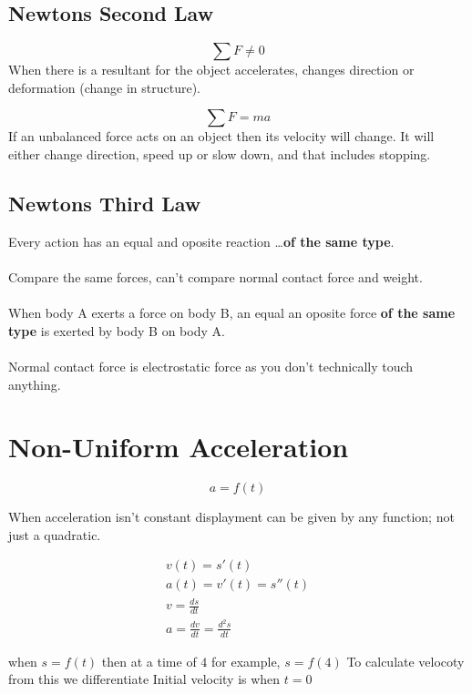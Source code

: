 \documentclass{article}
\begin{document}
\subsection{Newtons Second Law}
\begin{equation}
	\sum F \ne 0
\end{equation}
When there is a resultant for the object accelerates, changes direction or deformation (change in structure).

\begin{equation}
	\sum F = ma
\end{equation}
If an unbalanced force acts on an object then its velocity will change.
It will either change direction, speed up or slow down, and that includes stopping.

\subsection{Newtons Third Law}
Every action has an equal and oposite reaction \ldots \textbf{of the same type}.
\\\\
Compare the same forces, can't compare normal contact force and weight.
\\\\
When body A exerts a force on body B, an equal an oposite force \textbf{of the same type} is exerted by
body B on body A.
\\\\
Normal contact force is electrostatic force as you don't technically touch anything.


\section{Non-Uniform Acceleration}

\begin{equation}
	a = f(t)
\end{equation}


When acceleration isn't constant displayment can be given by any function; not just a quadratic.

\begin{gather}
	v(t) = s'(t) \\
	a(t) = v'(t) = s''(t) \\
	v = \frac{ds}{dt} \\
	a = \frac{dv}{dt} = \frac{d^2s}{dt}
\end{gather}


when  $s = f(t)$ then at a time of $4$ for example, $s = f(4)$
To calculate velocoty from this we differentiate
Initial velocity is when $t = 0$
\end{document}
